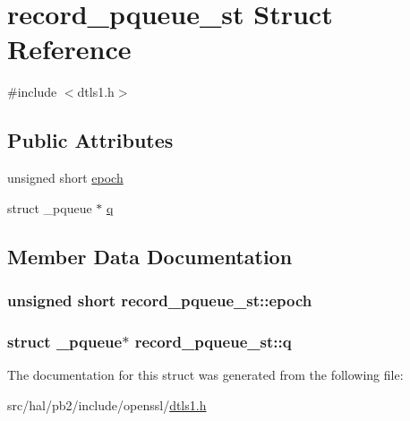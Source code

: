 \hypertarget{structrecord__pqueue__st}{}\section{record\+\_\+pqueue\+\_\+st Struct Reference}
\label{structrecord__pqueue__st}


{\ttfamily \#include $<$dtls1.\+h$>$}

\subsection*{Public Attributes}
\begin{DoxyCompactItemize}
\item 
unsigned short \hyperlink{structrecord__pqueue__st_afac67173059e6a13ddfaad940046c5b4}{epoch}
\item 
struct \+\_\+pqueue $\ast$ \hyperlink{structrecord__pqueue__st_a34e56dcddbf1f24803532ff7b18398ed}{q}
\end{DoxyCompactItemize}


\subsection{Member Data Documentation}
\subsubsection[{\texorpdfstring{epoch}{epoch}}]{\setlength{\rightskip}{0pt plus 5cm}unsigned short record\+\_\+pqueue\+\_\+st\+::epoch}\hypertarget{structrecord__pqueue__st_afac67173059e6a13ddfaad940046c5b4}{}\label{structrecord__pqueue__st_afac67173059e6a13ddfaad940046c5b4}
\subsubsection[{\texorpdfstring{q}{q}}]{\setlength{\rightskip}{0pt plus 5cm}struct \+\_\+pqueue$\ast$ record\+\_\+pqueue\+\_\+st\+::q}\hypertarget{structrecord__pqueue__st_a34e56dcddbf1f24803532ff7b18398ed}{}\label{structrecord__pqueue__st_a34e56dcddbf1f24803532ff7b18398ed}


The documentation for this struct was generated from the following file\+:\begin{DoxyCompactItemize}
\item 
src/hal/pb2/include/openssl/\hyperlink{dtls1_8h}{dtls1.\+h}\end{DoxyCompactItemize}
